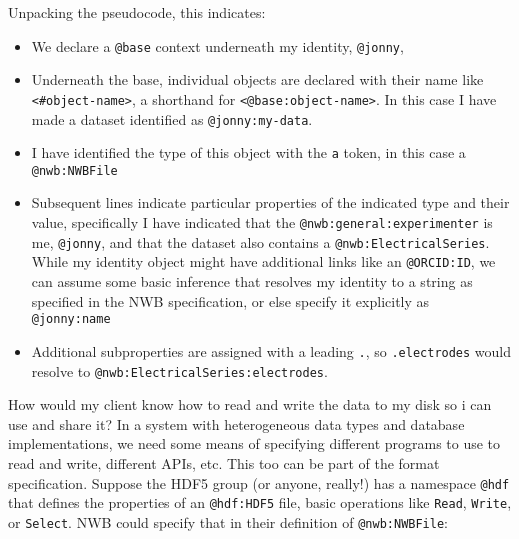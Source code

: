 \begin{Shaded}
\begin{Highlighting}[]

\end{Highlighting}
\end{Shaded}

Unpacking the pseudocode, this indicates:

\begin{itemize}

\item
  We declare a \texttt{@base} context underneath my identity,
  \texttt{@jonny},
\item
  Underneath the base, individual objects are declared with their name
  like \texttt{\textless{}\#object-name\textgreater{}}, a shorthand for
  \texttt{\textless{}@base:object-name\textgreater{}}. In this case I
  have made a dataset identified as \texttt{@jonny:my-data}.
\item
  I have identified the type of this object with the \texttt{a} token,
  in this case a \texttt{@nwb:NWBFile}
\item
  Subsequent lines indicate particular properties of the indicated type
  and their value, specifically I have indicated that the
  \texttt{@nwb:general:experimenter} is me, \texttt{@jonny}, and that
  the dataset also contains a \texttt{@nwb:ElectricalSeries}. While my
  identity object might have additional links like an
  \texttt{@ORCID:ID}, we can assume some basic inference that resolves
  my identity to a string as specified in the NWB specification, or else
  specify it explicitly as \texttt{@jonny:name}
\item
  Additional subproperties are assigned with a leading \texttt{.}, so
  \texttt{.electrodes} would resolve to
  \texttt{@nwb:ElectricalSeries:electrodes}.
\end{itemize}

How would my client know how to read and write the data to my disk so i
can use and share it? In a system with heterogeneous data types and
database implementations, we need some means of specifying different
programs to use to read and write, different APIs, etc. This too can be
part of the format specification. Suppose the HDF5 group (or anyone,
really!) has a namespace \texttt{@hdf} that defines the properties of an
\texttt{@hdf:HDF5} file, basic operations like \texttt{Read},
\texttt{Write}, or \texttt{Select}. NWB could specify that in their
definition of \texttt{@nwb:NWBFile}:

